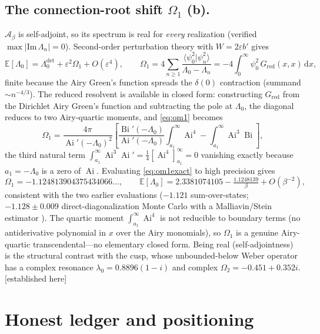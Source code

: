 \documentclass[11pt,reqno]{amsart}
\theoremstyle{plain}
\theoremstyle{definition}
\theoremstyle{remark}
\newcommand{\dd}{\,\mathrm{d}}
\newcommand{\E}{\mathbb{E}}
\newcommand{\SAO}{\mathcal{A}_\beta}
\newcommand{\eps}{\varepsilon}
\DeclareMathOperator{\Ai}{Ai}
\DeclareMathOperator{\Bi}{Bi}
\newcommand{\tagPr}{{\footnotesize\textsf{[established here]}}}
\begin{document}
\subsection{The connection-root shift $\Omega_1$ (b).}
$\SAO$ is self-adjoint, so its spectrum is real for \emph{every} realization (verified
$\max|\mathrm{Im}\,\Lambda_n|=0$). Second-order perturbation theory with $W=2\eps b'$ gives
\begin{equation}\label{eq:om1}
\E[\Lambda_0]=\Lambda_0^{\det}+\eps^2\Omega_1+O(\eps^4),\qquad
\Omega_1=4\!\sum_{n\ge1}\frac{\langle\psi_0^2|\psi_n^2\rangle}{\Lambda_0-\Lambda_n}
=-4\!\int_0^\infty\!\psi_0^2\,G_{\mathrm{red}}(x,x)\dd x,
\end{equation}
finite because the Airy Green's function spreads the $\delta(0)$ contraction (summand $\sim n^{-4/3}$).
The reduced resolvent is available in closed form: constructing $G_{\mathrm{red}}$ from the Dirichlet
Airy Green's function and subtracting the pole at $\Lambda_0$, the diagonal reduces to two
Airy-quartic moments, and \eqref{eq:om1} becomes
\begin{equation}\label{eq:om1exact}
\Omega_1=\frac{4\pi}{\Ai'(-\Lambda_0)^2}\left[\frac{\Bi'(-\Lambda_0)}{\Ai'(-\Lambda_0)}
\int_{a_1}^\infty\!\Ai^4-\int_{a_1}^\infty\!\Ai^3\Bi\right],
\end{equation}
the third natural term $\int_{a_1}^\infty\Ai^3\Ai'=\tfrac14[\Ai^4]_{a_1}^\infty=0$ vanishing exactly
because $a_1=-\Lambda_0$ is a zero of $\Ai$. Evaluating \eqref{eq:om1exact} to high precision gives
\begin{equation}\label{eq:om1val}
\Omega_1=-1.124813904375434066\ldots,\qquad
\E[\Lambda_0]=2.3381074105-\tfrac{1.1248139}{\beta}+O(\beta^{-2}),
\end{equation}
consistent with the two earlier evaluations ($-1.121$ sum-over-states; $-1.128\pm0.009$
direct-diagonalization Monte Carlo with a Malliavin/Stein estimator \cite{Viens}). The quartic
moment $\int_{a_1}^\infty\Ai^4$ is not reducible to boundary terms (no antiderivative polynomial in
$x$ over the Airy monomials), so $\Omega_1$ is a genuine Airy-quartic transcendental---no elementary
closed form. Being real (self-adjointness) is the structural contrast with the cusp, whose
unbounded-below Weber operator has a complex resonance $\lambda_0=0.8896(1-i)$ and complex
$\Omega_2=-0.451+0.352i$. \tagPr

\section{Honest ledger and positioning}\label{sec:ledger}
\end{document}
